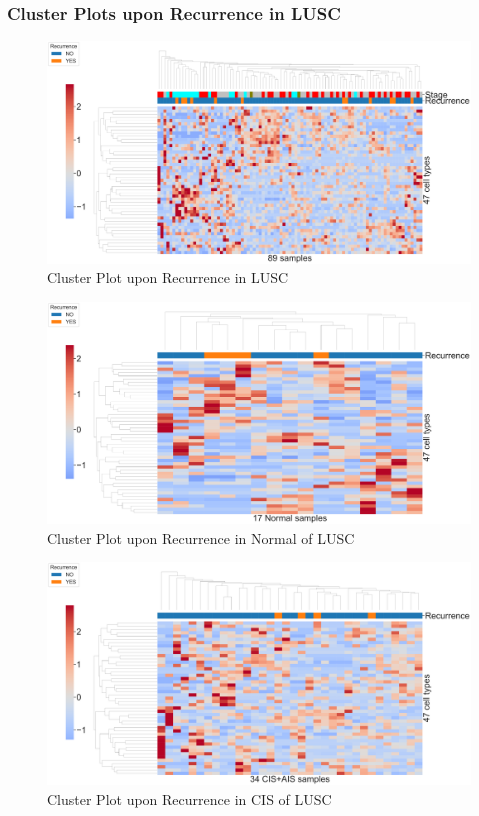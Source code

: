 \documentclass{beamer}
\begin{document}
    \begin{frame}[allowframebreaks]
        \frametitle{Cluster Plots upon Recurrence in LUSC}

        \begin{figure}
            \includegraphics[width=0.9 \linewidth]{figures/BisqueRNA/clustermap/STAR.FPKM.GSE131907.SQC.Recurrence/All.pdf}
            \caption{Cluster Plot upon Recurrence in LUSC}
        \end{figure}

        \begin{figure}
            \includegraphics[width=0.9 \linewidth]{figures/BisqueRNA/clustermap/STAR.FPKM.GSE131907.SQC.Recurrence/Normal.pdf}
            \caption{Cluster Plot upon Recurrence in Normal of LUSC}
        \end{figure}

        \begin{figure}
            \includegraphics[width=0.9 \linewidth]{figures/BisqueRNA/clustermap/STAR.FPKM.GSE131907.SQC.Recurrence/CIS+AIS.pdf}
            \caption{Cluster Plot upon Recurrence in CIS of LUSC}
        \end{figure}


\end{frame}
\end{document}
